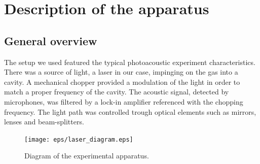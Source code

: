 \chapter{Description of the apparatus}\label{chapter1}
\section{General overview}
The setup we used featured the typical photoacoustic experiment characteristics. There was a source of light, a laser in our case, impinging on the gas into a cavity. A mechanical chopper provided a modulation of the light in order to match a proper frequency of the cavity. The acoustic signal, detected by microphones, was filtered by a lock-in amplifier referenced with the chopping frequency. The light path was controlled trough optical elements such as mirrors, lenses and beam-splitters. 
\begin{figure}[!bhpt]\centering
\texttt{[image: eps/laser\_diagram.eps]}
\caption{Diagram of the experimental apparatus.}
\label{diagram}
\end{figure}

